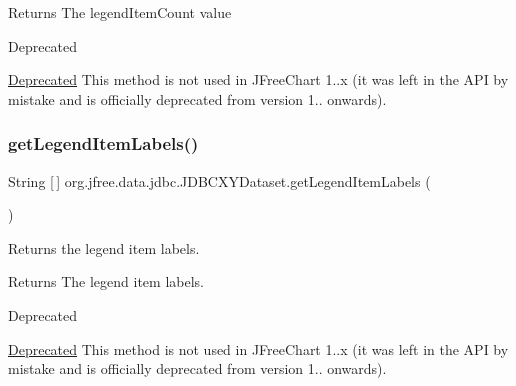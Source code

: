 \begin{DoxyReturn}{Returns}
The legend\+Item\+Count value
\end{DoxyReturn}
\begin{DoxyRefDesc}{Deprecated}
\item[\mbox{\hyperlink{deprecated__deprecated000263}{Deprecated}}]This method is not used in J\+Free\+Chart 1..\+x (it was left in the A\+PI by mistake and is officially deprecated from version 1.. onwards). \end{DoxyRefDesc}
\mbox{\label{classorg_1_1jfree_1_1data_1_1jdbc_1_1_j_d_b_c_x_y_dataset_a19141198ff30e4c4e77e1c66c597d936}} 
\subsubsection{\texorpdfstring{get\+Legend\+Item\+Labels()}{getLegendItemLabels()}}
{\footnotesize\ttfamily String \mbox{[}$\,$\mbox{]} org.\+jfree.\+data.\+jdbc.\+J\+D\+B\+C\+X\+Y\+Dataset.\+get\+Legend\+Item\+Labels (\begin{DoxyParamCaption}{ }\end{DoxyParamCaption})}

Returns the legend item labels.

\begin{DoxyReturn}{Returns}
The legend item labels.
\end{DoxyReturn}
\begin{DoxyRefDesc}{Deprecated}
\item[\mbox{\hyperlink{deprecated__deprecated000264}{Deprecated}}]This method is not used in J\+Free\+Chart 1..\+x (it was left in the A\+PI by mistake and is officially deprecated from version 1.. onwards). \end{DoxyRefDesc}
\mbox{\label{classorg_1_1jfree_1_1data_1_1jdbc_1_1_j_d_b_c_x_y_dataset_ae0f62e6428726eda9b6d9736c11ac5c6}} 
